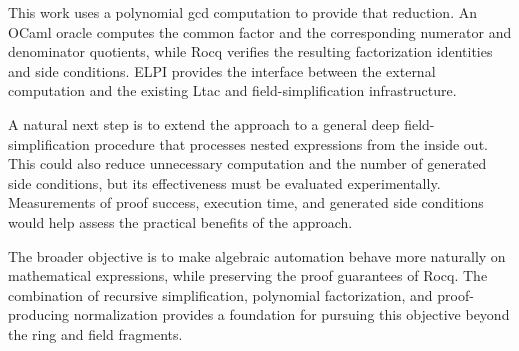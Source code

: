 \documentclass[11pt]{article}
\begin{document}
This work uses a polynomial gcd computation to provide that reduction. An
OCaml oracle computes the common factor and the corresponding numerator and
denominator quotients, while Rocq verifies the resulting factorization
identities and side conditions. ELPI provides the interface between the
external computation and the existing Ltac and field-simplification
infrastructure.

A natural next step is to extend the approach to a general deep field-simplification procedure that processes nested expressions from the inside out. This could also reduce unnecessary computation and the number of generated side conditions, but its effectiveness must be evaluated experimentally. Measurements of proof success, execution time, and generated side conditions would help assess the practical benefits of the approach.

The broader objective is to make algebraic automation behave more
naturally on mathematical expressions, while preserving the
proof guarantees of Rocq. The combination of recursive
simplification, polynomial factorization, and proof-producing
normalization provides a foundation for pursuing this objective
beyond the ring and field fragments.



\end{document}
